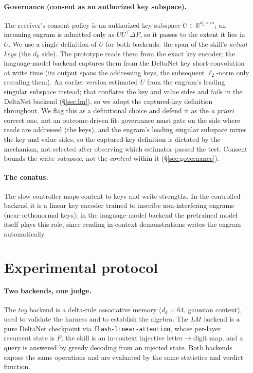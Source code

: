 \documentclass[11pt]{article}
\theoremstyle{definition}
\newcommand{\R}{\mathbb{R}}
\newcommand{\F}{F}
\newcommand{\dk}{d_k}
\begin{document}
\paragraph{Governance (consent as an authorized key subspace).}
The receiver's consent policy is an authorized key subspace $U\in\R^{\dk\times m}$; an incoming engram is admitted only as $U U^\top\Delta\F$, so it passes to the extent it lies in $U$. We use a single definition of $U$ for both backends: the span of the skill's \emph{actual keys} (the $\dk$ side). The prototype reads them from the exact key encoder; the language-model backend captures them from the DeltaNet key short-convolution at write time (its output spans the addressing keys, the subsequent $\ell_2$-norm only rescaling them). An earlier version estimated $U$ from the engram's leading singular subspace instead; that conflates the key and value sides and fails in the DeltaNet backend (\S\ref{sec:lm}), so we adopt the captured-key definition throughout. We flag this as a definitional choice and defend it as the \emph{a priori} correct one, not an outcome-driven fit: governance must gate on the side where reads are addressed (the keys), and the engram's leading singular subspace mixes the key and value sides, so the captured-key definition is dictated by the mechanism, not selected after observing which estimator passed the test. Consent bounds the write \emph{subspace}, not the \emph{content} within it (\S\ref{sec:governance}).

\paragraph{The conatus.}
The slow controller maps content to keys and write strengths. In the controlled backend it is a linear key encoder trained to inscribe non-interfering engrams (near-orthonormal keys); in the language-model backend the pretrained model itself plays this role, since reading in-context demonstrations writes the engram automatically.

\section{Experimental protocol}
\label{sec:protocol}

\paragraph{Two backends, one judge.}
The \emph{toy} backend is a delta-rule associative memory ($\dk=64$, gaussian content), used to validate the harness and to establish the algebra. The \emph{LM} backend is a pure DeltaNet checkpoint via \texttt{flash-linear-attention}, whose per-layer recurrent state is $\F$; the skill is an in-context injective letter$\to$digit map, and a query is answered by greedy decoding from an injected state. Both backends expose the same operations and are evaluated by the same statistics and verdict function.
\end{document}
